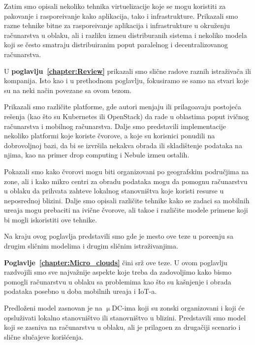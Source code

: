 Zatim smo opisali nekoliko tehnika virtuelizacije koje se mogu koristiti za pakovanje i raspore\dj ivanje kako aplikacija, tako i infrastrukture. Prikazali smo razne tehnike bitne za raspore\dj ivanje aplikacija i infrastrukture u okru\v zenju ra\v cunarstva u oblaku, ali i razliku izme\dj u distriburanih sistema i nekoliko modela koji se \v cesto smatraju distribuiranim poput paralelnog i decentralizovanog ra\v cunarstva.

U \textbf{poglavlju~\ref{chapter:Review}} prikazali smo sli\v cne radove raznih istra\v ziva\v ca ili kompanija. Isto kao i u prethodnom poglavlju, fokusiramo se samo na stvari koje su na neki na\v cin povezane sa ovom tezom.

Prikazali smo razli\v cite platforme, gde autori menjaju ili prilago\dj avaju postoje\'ca re\v senja (kao \v sto su Kubernetes ili OpenStack) da rade u oblastima poput ivi\v cnog ra\v cunarstva i mobilnog ra\v cunarstva. Dalje smo predstavili implementacije nekoliko platformi koje koriste \v cvorove, a koje su korisnici ponudili na dobrovoljnoj bazi, da bi se izvr\v sila nekakva obrada ili skladi\v stenje podataka na njima, kao na primer drop computing i Nebule izme\dj u ostalih.

Pokazali smo kako \v cvorovi mogu biti organizovani po geografskim podru\v cjima na zone, ali i kako mikro centri za obradu podataka mogu da pomognu ra\v cunarstvu u oblaku da prihvata zahteve lokalnog stanovni\v stva koje koristi resurse u neposrednoj blizini. Dalje smo opisali razli\v cite tehnike kako se zadaci sa mobilnih ure\dj aja mogu prebaciti na ivi\v cne \v cvorove, ali tako\dj e i razli\v cite modele primene koji bi mogli iskoristiti ove tehnike.

Na kraju ovog poglavlja predstavili smo gde je mesto ove teze u pore\dj enju sa drugim sli\v cnim modelima i drugim sli\v cnim istra\v zivanjima.

\textbf{Poglavlje~\ref{chapter:Micro_clouds}} \v cini sr\v z ove teze. U ovom poglavlju razdvojili smo sve najva\v znije aspekte koje treba da zadovoljimo kako bismo pomogli ra\v cunarstvu u oblaku sa problemima kao \v sto su ka\v snjenje i obrada podataka posebno u doba mobilnih ure\dj aja i IoT-a.

Predlo\v zeni model zasnovan je na $\upmu$DC-ima koji su zonski organizovani i koji \'ce opslu\v zivati lokalno stanovni\v stvo ili stanovni\v stvo u blizini. Predstavili smo model koji se zasniva na ra\v cunarstvu u oblaku, ali je prilago\dj en za druga\v ciji scenario i sli\v cne slu\v cajeve kori\v s\'cenja.

